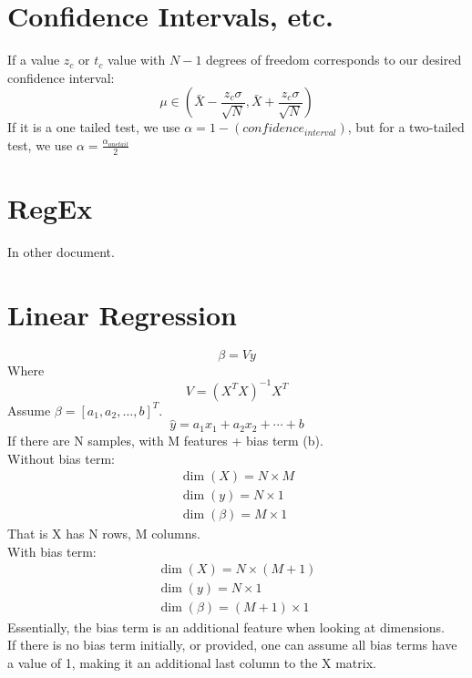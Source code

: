 \documentclass{article}
\begin{document}
\section{Confidence Intervals, etc.}
If a value $z_c$ or $t_c$ value with $N-1$ degrees of freedom corresponds to our desired confidence interval:
\begin{equation*}
    \mu \in \left(\bar{X} -\frac{z_c\sigma}{\sqrt{N}},\bar{X}+\frac{z_c\sigma}{\sqrt{N}}\right)
\end{equation*} 
If it is a one tailed test, we use $\alpha=1-(confidence_{interval})$, but for a two-tailed test, we use $\alpha = \frac{\alpha_{onetail}}{2}$
\section{RegEx}
In other document.
\section{Linear Regression}

\begin{equation*}
    \beta = Vy
\end{equation*}
Where 
\begin{equation*}
    V = (X^T X)^{-1}X^T
\end{equation*}
Assume $\beta = [a_1,a_2,\ldots, b]^T$. \\
\begin{equation*}
    \hat{y} = a_1 x_1 +a_2 x_2 + \cdots + b
\end{equation*}
If there are N samples, with M features + bias term (b).\\
Without bias term:
\begin{eqnarray*}
    \dim(X) = N\times M\\
    \dim(y) = N\times 1\\
    \dim(\beta) = M\times 1 
\end{eqnarray*}
That is X has N rows, M columns.\\
With bias term:
\begin{eqnarray*}
    \dim(X) = N\times (M+1)\\
    \dim(y) = N\times 1\\
    \dim(\beta) = (M+1)\times 1 
\end{eqnarray*}
Essentially, the bias term is an additional feature when looking at dimensions.\\
If there is no bias term initially, or provided, one can assume all bias terms have a value of 1, making it an additional last column to the X matrix.
\end{document}
